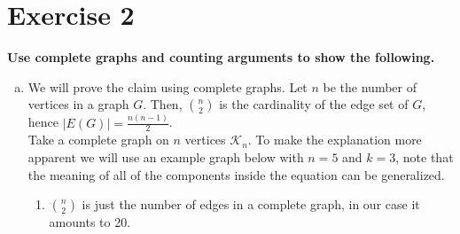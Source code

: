 \section*{Exercise 2}
\textbf{Use complete graphs and counting arguments to show the following.}
\begin{enumerate}[a)]
    \item We will prove the claim using complete graphs. Let $n$ be the number of vertices in a graph $G$. Then, $\binom{n}{2}$ is the cardinality of the edge set of $G$, hence $|E(G)| = \frac{n(n-1)}{2}$. \\
    \linebreak 
    Take a complete graph on $n$ vertices $\mathcal{K}_n$. To make the explanation more apparent we will use an example graph below with $n = 5$ and $k = 3$, note that the meaning of all of the components inside the equation can be generalized.
\begin{enumerate}
    \item $\binom{n}{2}$ is just the number of edges in a complete graph, in our case it amounts to 20.
        \begin{center}
\end{center}
\end{enumerate}
\end{enumerate}
